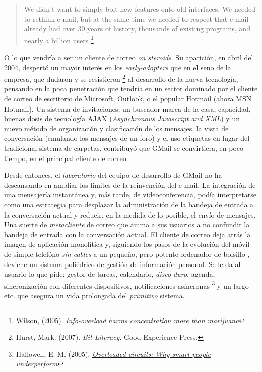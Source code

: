 \documentclass[12pt, a4paper,twoside]{book}
\begin{document}
\begin{quote}
We didn't want to simply bolt new features onto old interfaces. We
needed to rethink e-mail, but at the same time we needed to respect
that e-mail already had over 30 years of history, thousands of
existing programs, and nearly a billion users%
\footnote{Wilson, (2005).
\emph{\href{http://www.newscientist.com/article/mg18624973.400}{Info-overload harms concentration more than marijuana}}}

\end{quote}
O lo que vendría a ser un cliente de correo \emph{on steroids}. Su
aparición, en abril del 2004, despertó un mayor interés en los
\emph{early-adopters} que en el seno de la empresa, que dudaron y
se resistieron%
\footnote{Hurst, Mark. (2007). \emph{Bit Literacy}. Good Experience Press.}
al desarrollo de la nueva tecnología, pensando en la poca
penetración que tendría en un sector dominado por el cliente de
correo de escritorio de Microsoft, Outlook, o el popular Hotmail
(ahora MSN Hotmail). Un sistema de invitaciones, un buscador marca
de la casa, capacidad, buenas dosis de tecnología AJAX
(\emph{Asynchronous Javascript and XML}) y un nuevo método de
organización y clasificación de los mensajes, la vista de
conversación (emulando los mensajes de un foro) y el uso etiquetas
en lugar del tradicional sistema de carpetas, contribuyó que GMail
se convirtiera, en poco tiempo, en el principal cliente de correo.

Desde entonces, el \emph{laboratorio} del equipo de desarrollo de
GMail no ha descansando en ampliar los límites de la reinvención
del e-mail. La integración de una mensajería instantánea y, más
tarde, de videoconferencia, podía interpretarse como una estrategia
para desplazar la administración de la bandeja de entrada a la
conversación actual y reducir, en la medida de lo posible, el envío
de mensajes. Una suerte de \emph{metacliente} de correo que anima a
sus usuarios a no confundir la bandeja de entrada con la
conversación actual. El cliente de correo deja atrás la imagen de
aplicación monolítica y, siguiendo los pasos de la evolución del
móvil -de simple telefóno \emph{sin cables} a un pequeño, pero
potente ordenador de bolsillo-, deviene un sistema poliédrico de
gestión de información personal. Se le da al usuario lo que pide:
gestor de tareas, calendario, \emph{disco duro}, agenda,
sincronización con diferentes dispositivos, notificaciones
asíncronas%
\footnote{Hallowell, E. M. (2005).
\emph{\href{http://tr.im/wSsS}{Overloaded circuits: Why smart people underperform}}}
y un largo etc. que asegura un vida prolongada del \emph{primitivo}
sistema.
\end{document}
